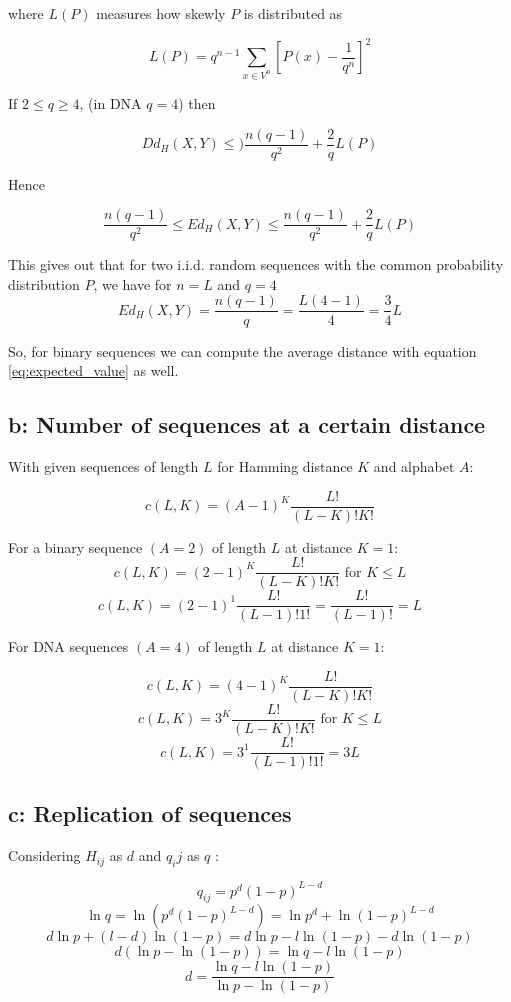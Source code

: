 where $L(P)$ measures how skewly $P$ is distributed as

\[  L(P) = q^{n-1} \sum\limits_{x \in V^n} \left[P(x)-\frac{1}{q^n}\right]^2 \]

If $ 2\leq q \geq 4$, (in DNA $q=4$) then 

\[  Dd_H(X,Y) \leq )\frac{n(q-1)}{q^2} + \frac{2}{q}L(P) \]

Hence

\[  \frac{n(q-1)}{q^2}  \leq Ed_H(X,Y) \leq \frac{n(q-1)}{q^2} + \frac{2}{q}L(P) \]

This gives out that for two i.i.d. random sequences with the common probability distribution $P$, we have for  $n = L$ and $q = 4$
\begin{equation}
Ed_H(X,Y)  = \frac{n(q-1)}{q} = \frac{L(4-1)}{4} = \frac{3}{4}L
\label{eq:expected_value}
\end{equation}

So, for binary sequences we can compute the average distance with equation \ref{eq:expected_value} as well.

\subsection{b: Number of sequences at a certain distance}

With given sequences of length $L$ for Hamming distance $K$ and alphabet $A$:

\[  c(L,K) = (A-1)^K\frac{L!}{(L-K)!K!} \]

For a binary sequence $(A = 2)$ of length $L$ at distance $K = 1$: 
\[  c(L,K) = (2-1)^K\frac{L!}{(L-K)!K!} \text{ for } K\leq L  \]
\[  c(L,K) = (2-1)^1\frac{L!}{(L-1)!1!} = \frac{L!}{(L-1)!}  = L\]

For DNA sequences $(A = 4) $ of length $L$ at distance $K = 1 $:

\[  c(L,K) = (4-1)^K\frac{L!}{(L-K)!K!} \]
\[  c(L,K) = 3^K\frac{L!}{(L-K)!K!} \text{ for } K\leq L \]
\[  c(L,K) = 3^1\frac{L!}{(L-1)!1!} = 3L \]

\subsection{c: Replication of sequences}

Considering $H_{ij}$ as $d$ and $q_ij$ as $q$ : 

\[ q_{ij} = p^d(1-p)^{L-d} \]
\[ \ln q = \ln (p^d(1-p)^{L-d}) = \ln p^d + \ln (1-p)^{L-d} \]
\[ d \ln p + (l-d) \ln (1-p) = d \ln p - l \ln(1-p) - d \ln (1-p)  \]
\[ d(\ln p - \ln (1-p))  = \ln q - l \ln (1-p) \]
\[ d = \frac{\ln q - l \ln (1-p)}{\ln p -\ln (1-p)}\]



